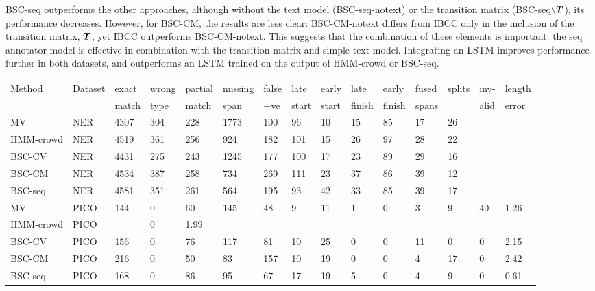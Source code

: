 BSC-seq outperforms the other approaches, although 
without the text model (BSC-seq-notext) or the transition matrix (BSC-seq$\backslash\boldsymbol T$),
its performance decreases.
However, for BSC-CM, the results are less clear: BSC-CM-notext differs from IBCC only in the 
inclusion of the transition matrix, $\boldsymbol T$, yet IBCC outperforms BSC-CM-notext.
This suggests that the combination of these elements is important: the seq annotator model is effective 
in combination with the transition matrix and simple text model.
Integrating an LSTM improves performance further in both datasets, and outperforms an LSTM trained on the output of HMM-crowd or BSC-seq.

\begin{table}[h]
\small
\centering
\setlength{\tabcolsep}{4pt}
\begin{tabular}{l l l l l l l l l l l l l l l }
\toprule
Method & Dataset & exact & wrong & partial  & missing  & false & late & early & late & early & fused & splits & inv- &  length \\ 
 & & match & type & match & span & +ve & start & start & finish & finish & spans &  & alid & error \\
\midrule
MV & NER & 4307 & 304 & 228 & 1773 & 100 & 96 & 10 & 15 & 85 & 17 & 26 \\
HMM-crowd & NER & 4519 & 361 & 256 & 924 & 182 & 101 & 15 & 26 & 97 & 28 & 22 \\
BSC-CV & NER & 4431 & 275 & 243 & 1245 & 177 & 100 & 17 & 23 & 89 & 29 & 16 \\
BSC-CM & NER & 4534 & 387 & 258 & 734 & 269 & 111 & 23 & 37 & 86 & 39 & 12 \\
BSC-seq & NER & 4581 & 351 & 261 & 564 & 195 & 93 & 42 & 33 & 85 & 39 & 17 
\\
\midrule 
MV & PICO  & 144 & 0 & 60 & 145 & 48 & 9 & 11 & 1 & 0 & 3 & 9 & 40 & 1.26 \\
HMM-crowd& PICO &  & 0 & 1.99 \\
BSC-CV     & PICO & 156 & 0 & 76 & 117 & 81 & 10 & 25 & 0 & 0 & 11 & 0 & 0 & 2.15 \\
BSC-CM     & PICO & 216 & 0 & 50 & 83 & 157 & 10 & 19 & 0 & 0 & 4 & 17 & 0 & 2.42\\
BSC-seq    & PICO & 168 & 0 & 86 & 95 & 67 & 17 & 19 & 5 & 0 & 4 & 9 & 0 & 0.61 \\

\end{tabular}
\end{table}
